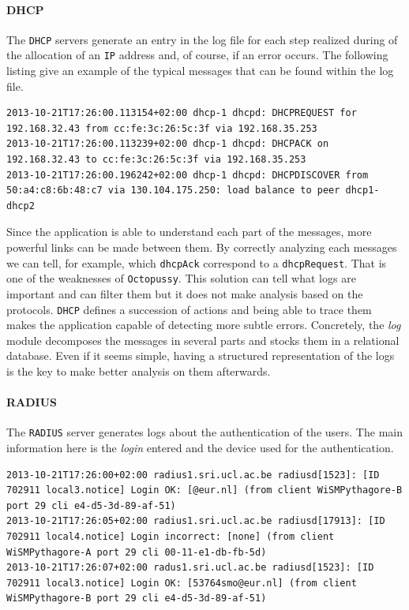 \paragraph{DHCP}
The \texttt{DHCP} servers generate an entry in the log file for each step realized during of the allocation of an \texttt{IP} address and, of course, if an error occurs. The following listing give an example of the typical messages that can be found within the log file.\\

\begin{lstlisting}[frame=single,breaklines=true,caption={\texttt{DHCP} logs}]
2013-10-21T17:26:00.113154+02:00 dhcp-1 dhcpd: DHCPREQUEST for 192.168.32.43 from cc:fe:3c:26:5c:3f via 192.168.35.253
2013-10-21T17:26:00.113239+02:00 dhcp-1 dhcpd: DHCPACK on 192.168.32.43 to cc:fe:3c:26:5c:3f via 192.168.35.253
2013-10-21T17:26:00.196242+02:00 dhcp-1 dhcpd: DHCPDISCOVER from 50:a4:c8:6b:48:c7 via 130.104.175.250: load balance to peer dhcp1-dhcp2
\end{lstlisting}

Since the application is able to understand each part of the messages, more powerful links can be made between them. By correctly analyzing each messages we can tell, for example, which \texttt{dhcpAck} correspond to a \texttt{dhcpRequest}. That is one of the weaknesses of \texttt{Octopussy}. This solution can tell what logs are important and can filter them but it does not make analysis based on the protocols. \texttt{DHCP} defines a succession of actions and being able to trace them makes the application capable of detecting more subtle errors. Concretely, the \emph{log} module decomposes the messages in several parts and stocks them in a relational database. Even if it seems simple, having a structured representation of the logs is the key to make better analysis on them afterwards.


\paragraph{RADIUS}
The \texttt{RADIUS} server generates logs about the authentication of the users. The main information here is the \emph{login} entered and the device used for the authentication.\\

\begin{lstlisting}[frame=single,breaklines=true,caption={\texttt{RADIUS} logs}]
2013-10-21T17:26:00+02:00 radius1.sri.ucl.ac.be radiusd[1523]: [ID 702911 local3.notice] Login OK: [@eur.nl] (from client WiSMPythagore-B port 29 cli e4-d5-3d-89-af-51)
2013-10-21T17:26:05+02:00 radius1.sri.ucl.ac.be radiusd[17913]: [ID 702911 local4.notice] Login incorrect: [none] (from client WiSMPythagore-A port 29 cli 00-11-e1-db-fb-5d)
2013-10-21T17:26:07+02:00 radus1.sri.ucl.ac.be radiusd[1523]: [ID 702911 local3.notice] Login OK: [53764smo@eur.nl] (from client WiSMPythagore-B port 29 cli e4-d5-3d-89-af-51)
\end{lstlisting}

